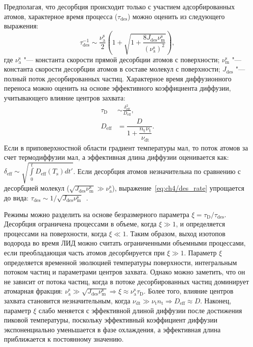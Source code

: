 Предполагая, что десорбция происходит только с участием адсорбированных атомов, характерное время процесса (\( \tau_\mathrm{des} \)) можно оценить из следующего выражения:
\begin{equation}
    \label{eq:ch4/des_rate}
    \tau_\mathrm{des}^{-1} \sim \dfrac{\nu_\mathrm{a}^\mathrm{s}}{2} \left( 1 + \sqrt{1+\dfrac{8J_\mathrm{des}\nu_\mathrm{m}^\mathrm{s}}{(\nu_\mathrm{a}^\mathrm{s})^2}} \right),
\end{equation}
где \( \nu_\mathrm{a}^\mathrm{s} \) "--- константа скорости прямой десорбции атомов с поверхности; \( \nu_\mathrm{m}^\mathrm{s} \) "--- константа скорости десорбции атомов в составе молекул с поверхности; \( J_\mathrm{des} \) "--- полный поток десорбированных частиц. Характерное время диффузионного переноса можно оценить на основе эффективного коэффициента диффузии, учитывающего влияние центров захвата:
\begin{subequations}
    \begin{align}
        \tau_\mathrm{D}         & \sim \frac{\delta_\mathrm{eff}^2}{D_\mathrm{eff}}, \\
        D_\mathrm{eff} & = \dfrac{D}{1+\dfrac{n_\mathrm{t}\nu_\mathrm{t}}{\nu_\mathrm{dt}}}. 
    \end{align}
\end{subequations}
Если в приповерхностной области градиент температуры мал, то поток атомов за счет термодиффузии мал, а эффективная длина диффузии оценивается как: \( \delta_\mathrm{eff} \sim \sqrt{\int\limits_0^t D_\mathrm{eff}(T_\mathrm{s})dt'}\). Если десорбция атомов незначительна по сравнению с десорбцией молекул (\(\sqrt{J_\mathrm{des}\nu_\mathrm{m}^{\mathrm{s}}} \gg \nu_\mathrm{a}^\mathrm{s}\)), выражение~\cref{eq:ch4/des_rate} упрощается до вида: \( \tau_\mathrm{des} \sim 1/\sqrt{J_\mathrm{des}\nu_\mathrm{m}^{\mathrm{s}}}\)~\cite{Guterl2019}.

Режимы можно разделить на основе безразмерного параметра \( \xi=\tau_\mathrm{D}/\tau_\mathrm{des} \). Десорбция ограничена процессами в объеме, когда \( \xi \gg 1 \), и определяется процессами на поверхности, когда \( \xi \ll 1 \). Таким образом, выход изотопов водорода во время ЛИД можно считать ограниченными объемными процессами, если преобладающая часть атомов десорбируется при \( \xi \gg 1 \). Параметр \( \xi \) определяется временной эволюцией температуры поверхности, интегральным потоком частиц и параметрами центров захвата. Однако можно заметить, что он не зависит от потока частиц, когда в потоке десорбированных частиц доминирует атомарная фракция: \( \nu_\mathrm{a}^\mathrm{s} \gg \sqrt{J_\mathrm{des}\nu_\mathrm{m}^{\mathrm{s}}} \Rightarrow \xi \approx \nu_\mathrm{a}^\mathrm{s}\tau_\mathrm{D} \). Более того, влияние центров захвата становится незначительным, когда \( \nu_\mathrm{dt} \gg \nu_\mathrm{t} n_\mathrm{t} \Rightarrow D_\mathrm{eff} \approx D \). Наконец, параметр \( \xi \) слабо меняется с эффективной длиной диффузии после достижения пиковой температуры, поскольку эффективный коэффициент диффузии экспоненциально уменьшается в фазе охлаждения, а эффективная длина приближается к постоянному значению.

